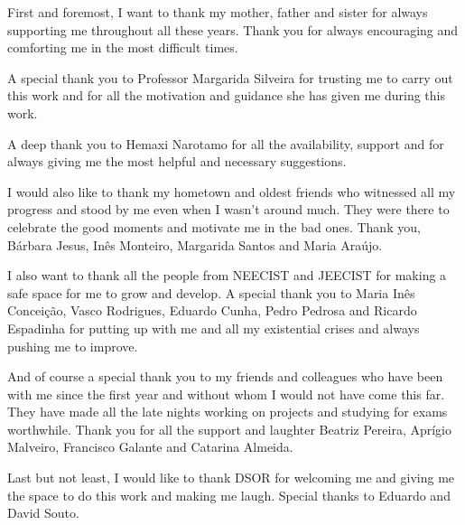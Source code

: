 
First and foremost, I want to thank my mother, father and sister for always supporting me throughout all these years. Thank you for always encouraging and comforting me in the most difficult times.

A special thank you to Professor Margarida Silveira for trusting me to carry out this work and for all the motivation and guidance she has given me during this work. 

A deep thank you to Hemaxi Narotamo for all the availability, support and for always giving me the most helpful and necessary suggestions.

I would also like to thank my hometown and oldest friends who witnessed all my progress and stood by me even when I wasn't around much. They were there to celebrate the good moments and motivate me in the bad ones. Thank you, Bárbara Jesus, Inês Monteiro, Margarida Santos and Maria Araújo.

I also want to thank all the people from NEECIST and JEECIST for making a safe space for me to grow and develop. A special thank you to Maria Inês Conceição, Vasco Rodrigues, Eduardo Cunha, Pedro Pedrosa and Ricardo Espadinha for putting up with me and all my existential crises and always pushing me to improve.

And of course a special thank you to my friends and colleagues who have been with me since the first year and without whom I would not have come this far. They have made all the late nights working on projects and studying for exams worthwhile. Thank you for all the support and laughter Beatriz Pereira, Aprígio Malveiro, Francisco Galante and Catarina Almeida.

Last but not least, I would like to thank DSOR for welcoming me and giving me the space to do this work and making me laugh. Special thanks to Eduardo and David Souto.